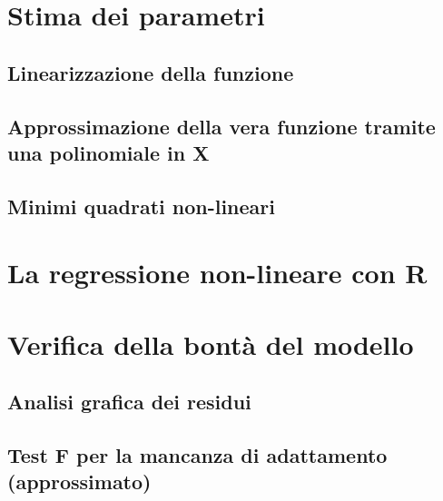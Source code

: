 \documentclass[a4paper,12pt,oneside]{book}
\begin{document}
\hypertarget{stima-dei-parametri-4}{%
\section{Stima dei parametri}\label{stima-dei-parametri-4}}

\hypertarget{linearizzazione-della-funzione}{%
\subsection{Linearizzazione della funzione}\label{linearizzazione-della-funzione}}

\hypertarget{approssimazione-della-vera-funzione-tramite-una-polinomiale-in-x}{%
\subsection{Approssimazione della vera funzione tramite una polinomiale in X}\label{approssimazione-della-vera-funzione-tramite-una-polinomiale-in-x}}

\hypertarget{minimi-quadrati-non-lineari}{%
\subsection{Minimi quadrati non-lineari}\label{minimi-quadrati-non-lineari}}

\hypertarget{la-regressione-non-lineare-con-r}{%
\section{La regressione non-lineare con R}\label{la-regressione-non-lineare-con-r}}

\hypertarget{verifica-della-bontuxe0-del-modello}{%
\section{Verifica della bontà del modello}\label{verifica-della-bontuxe0-del-modello}}

\hypertarget{analisi-grafica-dei-residui-1}{%
\subsection{Analisi grafica dei residui}\label{analisi-grafica-dei-residui-1}}

\hypertarget{test-f-per-la-mancanza-di-adattamento-approssimato}{%
\subsection{Test F per la mancanza di adattamento (approssimato)}\label{test-f-per-la-mancanza-di-adattamento-approssimato}}
\end{document}
